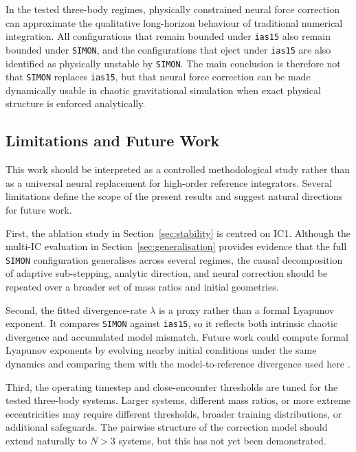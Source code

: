 \documentclass[12pt]{article}
\begin{document}
\noindent In the tested three-body regimes, physically constrained neural force correction
can approximate the qualitative long-horizon behaviour of traditional numerical
integration. All configurations that remain bounded under \texttt{ias15} also remain
bounded under \texttt{SIMON}, and the configurations that eject under \texttt{ias15} are
also identified as physically unstable by \texttt{SIMON}. The main conclusion is therefore
not that \texttt{SIMON} replaces \texttt{ias15}, but that neural force correction can be made
dynamically usable in chaotic gravitational simulation when exact physical structure is
enforced analytically.

\subsection{Limitations and Future Work}
\label{sec:limitations}

This work should be interpreted as a controlled methodological study rather than as a
universal neural replacement for high-order reference integrators. Several limitations
define the scope of the present results and suggest natural directions for future work.

First, the ablation study in Section~\ref{sec:stability} is centred on IC1. Although the
multi-IC evaluation in Section~\ref{sec:generalisation} provides evidence that the full
\texttt{SIMON} configuration generalises across several regimes, the causal decomposition
of adaptive sub-stepping, analytic direction, and neural correction should be repeated over
a broader set of mass ratios and initial geometries.

Second, the fitted divergence-rate $\lambda$ is a proxy rather than a formal Lyapunov
exponent. It compares \texttt{SIMON} against \texttt{ias15}, so it reflects both intrinsic
chaotic divergence and accumulated model mismatch. Future work could compute formal
Lyapunov exponents by evolving nearby initial conditions under the same dynamics and
comparing them with the model-to-reference divergence used here \citep{sep-chaos}.

Third, the operating timestep and close-encounter thresholds are tuned for the tested
three-body systems. Larger systems, different mass ratios, or more extreme eccentricities
may require different thresholds, broader training distributions, or additional safeguards.
The pairwise structure of the correction model should extend naturally to $N>3$ systems,
but this has not yet been demonstrated.
\end{document}
